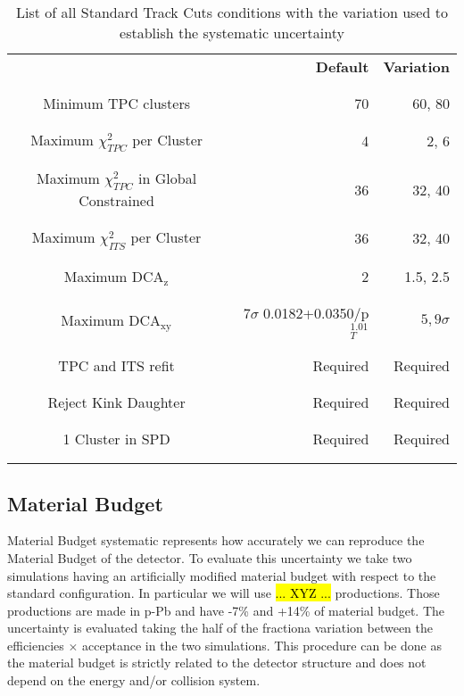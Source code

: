 \begin{table}[h]
\center
\begin{tabular}{c|r|r}
								&\textbf{Default}							&\textbf{Variation}		\\
								\\ \hline \\
Minimum TPC clusters 				&70										&60, 80\\
								\\ \hline \\
Maximum $\chi^2_{TPC}$ per Cluster	&4										&2, 6\\
								\\ \hline \\
Maximum $\chi^2_{TPC}$ in Global Constrained	&36								&32, 40\\
								\\ \hline \\
Maximum $\chi^2_{ITS}$ per Cluster		&36										&32, 40\\
								\\ \hline \\
Maximum DCA$_{\text{z}}$			&2										&1.5, 2.5\\
								\\ \hline \\
Maximum DCA$_{\text{xy}}$			&$7\sigma$ 0.0182+0.0350/p$_{T}^{1.01}$		&$5,9\sigma$\\
								\\ \hline \\
TPC and ITS refit					&Required								&Required\\
								\\ \hline \\
Reject Kink Daughter				&Required								&Required\\
								\\ \hline \\
1 Cluster in SPD					&Required								&Required\\
								\\ \hline \\

\end{tabular}
\caption{List of all Standard Track Cuts conditions with the variation used to establish the systematic uncertainty}
\label{tab:Syst_AC}
\end{table}

\subsection{Material Budget}
Material Budget systematic represents how accurately we can reproduce the Material Budget of the detector. To evaluate this uncertainty we take two simulations having an artificially modified material budget with respect to the standard configuration. In particular we will use \hl{... XYZ ...} productions. Those productions are made in p-Pb and have -7\% and +14\% of material budget. The uncertainty is evaluated taking the half of the fractiona variation between the efficiencies $\times$ acceptance in the two simulations. This procedure can be done as the material budget is strictly related to the detector structure and does not depend on the energy and/or collision system.

